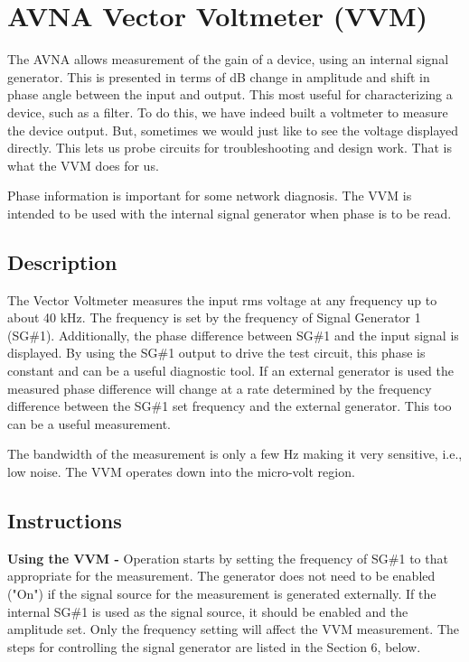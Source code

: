 \section{AVNA Vector Voltmeter  (VVM)}
The AVNA allows measurement of the gain of a device, using an internal signal generator.  This is presented in terms of dB change in amplitude and shift in phase angle between the input and output.  This most useful for characterizing a device, such as a filter.  To do this, we have indeed built a voltmeter to measure the device output.  But, sometimes we would just like to see the voltage displayed directly.  This lets us probe circuits for troubleshooting  and design work.   That is what the VVM does for us.

Phase information is important for some network diagnosis.  The VVM is intended to be used with the internal signal generator when phase is to be read.

\subsection{Description}
The Vector Voltmeter measures the input rms voltage at any frequency up to about 40 kHz.  The frequency is set by the frequency of Signal Generator 1 (SG\#1).  Additionally, the phase difference between SG\#1 and the input signal is displayed.  By using the SG\#1 output to drive the test circuit, this phase is constant and can be a useful diagnostic tool.   If an external generator is used the measured phase difference will change at a rate determined by the frequency difference between the SG\#1 set frequency and the external generator.    This too can be a useful measurement.  

The bandwidth of the measurement is only a few Hz making it very sensitive, i.e., low noise.  The VVM operates down into the micro-volt  region.

\subsection{Instructions}
\textbf{Using the VVM - }Operation starts  by setting the frequency of SG\#1 to that appropriate for the measurement.  The generator does not need to be enabled ("On") if the signal source for the measurement is generated externally.  If the internal SG\#1 is used as the signal source, it should be enabled and the amplitude set.   Only the frequency setting will affect the VVM measurement.  The steps for controlling the signal generator are listed in the Section 6, below.

